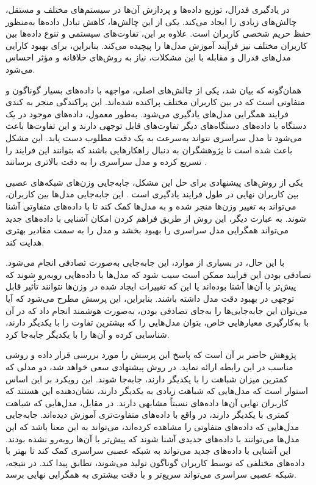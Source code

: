 در یادگیری فدرال، توزیع داده‌ها و پردازش آن‌ها در سیستم‌های مختلف و مستقل، چالش‌های زیادی را ایجاد می‌کند. یکی از این چالش‌ها، کاهش تبادل داده‌ها به‌منظور حفظ حریم شخصی کاربران است. علاوه بر این، تفاوت‌های سیستمی و تنوع داده‌ها بین کاربران مختلف نیز فرآیند آموزش مدل‌ها را پیچیده می‌کند. بنابراین، برای بهبود کارایی مدل‌های فدرال و مقابله با این مشکلات، نیاز به روش‌های خلاقانه و مؤثر احساس می‌شود.

همان‌گونه که بیان شد، یکی از چالش‌های اصلی، مواجهه با داده‌های بسیار گوناگون و متفاوتی است که در بین کاربران مختلف پراکنده شده‌اند. این پراکندگی منجر به کندی فرایند همگرایی مدل‌های یادگیری می‌شود. به‌طور معمول، داده‌های موجود در یک دستگاه با داده‌های دستگاه‌های دیگر تفاوت‌های قابل توجهی دارند و این تفاوت‌ها باعث می‌شود تا مدل سراسری نتواند به‌سرعت به یک دقت مطلوب دست یابد. این مشکل باعث شده است تا پژوهشگران به دنبال راهکارهایی باشند که بتوانند این فرایند را تسریع کرده و مدل سراسری را به دقت بالاتری برسانند
\cite{li2020federated}.

یکی از روش‌های پیشنهادی برای حل این مشکل، جابه‌جایی وزن‌های شبکه‌های عصبی بین کاربران نهایی در طول فرایند یادگیری است
\cite{chiu2020semisupervised}.
این جابه‌جایی مدل‌ها بین کاربران، می‌تواند به تغییر وزن‌ها منجر شده و به مدل‌ها کمک کند تا با داده‌های متفاوتی آشنا شوند.
به عبارت دیگر، این روش از طریق فراهم کردن امکان آشنایی با داده‌های جدید می‌تواند همگرایی مدل سراسری را بهبود بخشد و مدل را به سمت مقادیر بهتری هدایت کند.

با این حال، در بسیاری از موارد، این جابه‌جایی به‌صورت تصادفی انجام می‌شود. تصادفی بودن این فرایند ممکن است سبب شود که مدل‌ها با داده‌هایی روبه‌رو شوند که پیش‌تر با آن‌ها آشنا بوده‌اند یا این که تغییرات ایجاد شده در وزن‌ها نتوانند تأثیر قابل‌ توجهی در بهبود دقت مدل داشته باشند. بنابراین، این پرسش مطرح می‌شود که آیا می‌توان این جابه‌جایی‌ها را به‌جای تصادفی بودن، به‌صورت هوشمند انجام داد که در آن با به‌کارگیری معیارهایی خاص، بتوان مدل‌هایی را که بیشترین تفاوت را با یکدیگر دارند، شناسایی کرده و آن‌ها را با یکدیگر جابه‌جا کرد.

پژوهش حاضر بر آن است که پاسخ این پرسش را مورد بررسی قرار داده و روشی مناسب در این رابطه ارائه نماید. در روش پیشنهادی سعی خواهد شد، دو مدلی که کمترین میزان شباهت را با یکدیگر دارند، جابه‌جا شوند. این رویکرد بر این اساس استوار است که مدل‌هایی که شباهت زیادی به یکدیگر دارند، نشان‌دهنده این هستند که کاربران نهایی آن‌ها داده‌های نسبتاً مشابهی دارند. در مقابل، مدل‌هایی که شباهت کمتری با یکدیگر دارند، در واقع با داده‌های متفاوت‌تری آموزش دیده‌اند.
جابه‌جایی مدل‌هایی که داده‌های متفاوتی را مشاهده کرده‌اند، می‌تواند به این معنا باشد که این مدل‌ها می‌توانند با داده‌های جدیدی آشنا شوند که پیش‌تر با آن‌ها روبه‌رو نشده بودند. این آشنایی با داده‌های جدید می‌تواند به شبکه عصبی سراسری کمک کند تا بهتر با داده‌های مختلفی که توسط کاربران گوناگون تولید می‌شوند، تطابق پیدا کند. در نتیجه، شبکه عصبی سراسری می‌تواند سریع‌تر و با دقت بیشتری به همگرایی نهایی برسد.


